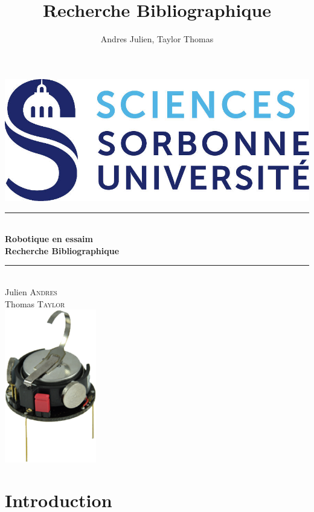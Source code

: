 \documentclass[a4paper]{article}
\title{Recherche Bibliographique}
\author{Andres Julien, Taylor Thomas}
\date{}
\newcommand{\HRule}{\rule{\linewidth}{0.5mm}} %
\begin{document}
\begin{titlepage}
\center

\includegraphics{incl/logo_sorbonne}\\[1cm] 

\HRule \\[0.4cm]
{ \huge \bfseries Robotique en essaim }\\
{ \huge \bfseries Recherche Bibliographique}\\[0.4cm] %
\HRule \\[1.5cm]



Julien \textsc{Andres}\\ %
Thomas \textsc{Taylor}\\[3cm]

\includegraphics[width=4cm]{incl/Kilobots.png}



\end{titlepage}

\newpage
\section{Introduction}
\end{document}

